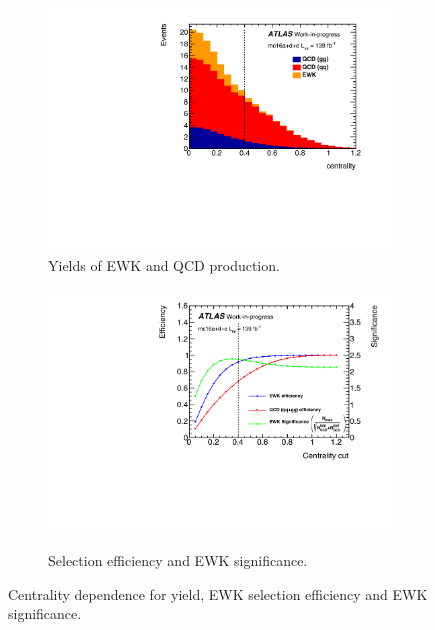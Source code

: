 \begin{figure}[ht]
\begin{subfigure}{.48\textwidth}
  \centering
  \includegraphics[width=.95\linewidth]{figures/AnalysisOverview/centrality_Dist.pdf}  
  \caption{Yields of EWK and QCD production.}
  \label{fig:centrality_a}
\end{subfigure}
\begin{subfigure}{.48\textwidth}
  \centering
  \includegraphics[width=.9\linewidth]{figures/AnalysisOverview/centrality_Cut.pdf}  \\
  \caption{Selection efficiency and EWK significance. }
  \label{fig:centrality_b}
\end{subfigure}
\caption{Centrality dependence for yield, EWK selection efficiency and EWK significance. }
\end{figure}
